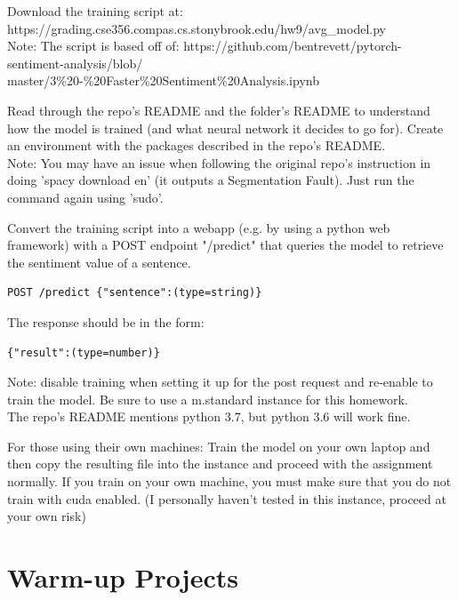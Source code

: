 \documentclass[fancy,11pt,titlestyle=display]{style/elegantbook}
\begin{document}
\begin{problemset}
\item Download the training script at:\\ https://grading.cse356.compas.cs.stonybrook.edu/hw9/avg\_model.py \\
Note: The script is based off of:  https://github.com/bentrevett/pytorch-sentiment-analysis/blob/\\master/3\%20-\%20Faster\%20Sentiment\%20Analysis.ipynb
\item Read through the repo's README and the folder's README to understand how the model is trained (and what neural network it decides to go for). Create an environment with the packages described in the repo's README. \\
Note: You may have an issue when following the original repo's instruction in doing 'spacy download en' (it outputs a Segmentation Fault). Just run the command again using 'sudo'.
\item Convert the training script into a webapp (e.g. by using a python web framework) with a POST endpoint "/predict" that queries the model to retrieve the sentiment value of a sentence. 
\begin{lstlisting}
POST /predict {"sentence":(type=string)}
\end{lstlisting}
The response should be in the form:
\begin{lstlisting}
{"result":(type=number)}
\end{lstlisting}
Note: disable training when setting it up for the post request and re-enable to train the model. Be sure to use a m.standard instance for this homework. \\
The repo's README mentions python 3.7, but python 3.6 will work fine.
\item For those using their own machines:
Train the model on your own laptop and then copy the resulting file into the instance and proceed with the assignment normally. If you train on your own machine, you must make sure that you do not train with cuda enabled. (I personally haven't tested in this instance, proceed at your own risk)
\end{problemset}
\chapter{Warm-up Projects}
\end{document}
